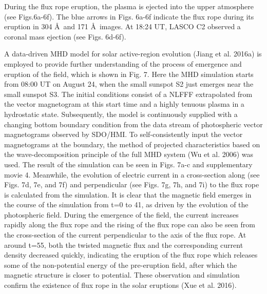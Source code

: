 \documentclass[12pt,preprint]{aastex}
\begin{document}
\begin{CJK*}{UTF8}{gbsn}
During the flux rope eruption, the plasma is ejected into the upper atmosphere (see Figs.6a-6f).  The blue arrows in Figs. 6a-6f indicate the flux rope during its eruption in 304 \AA\ and 171 \AA\ images. At 18:24 UT, LASCO C2 observed a coronal mass ejection (see Figs. 6d-6f).

A data-driven MHD model for solar active-region evolution (Jiang et al. 2016a) is employed to provide further understanding of the process of emergence and eruption of the field, which is shown in Fig. 7. Here the MHD simulation starts from 08:00 UT on August 24, when the small sunspot S2 just emerges near the small sunspot S3. The initial conditions consist of a NLFFF extrapolated from the vector magnetogram at this start time and a highly tenuous plasma in a hydrostatic state. Subsequently, the model is continuously supplied with a changing bottom boundary condition from the data stream of photospheric vector magnetograms observed by SDO/HMI. To self-consistently input the vector magnetograms at the boundary, the method of projected characteristics based on the wave-decomposition principle of the full MHD system (Wu et al. 2006) was used. The result of the simulation can be seen in Figs. 7a-c and supplementary movie 4. Meanwhile, the evolution of electric current in a cross-section along (see Figs. 7d, 7e, and 7f) and perpendicular (see Figs. 7g, 7h, and 7i) to the flux rope is calculated from the simulation. It is clear that the magnetic field emerges in the course of the simulation from t=0 to 41, as driven by the evolution of the photospheric field.  During the emergence of the field, the current increases rapidly along the flux rope and the rising of the flux rope can also be seen from the cross-section of the current perpendicular to the axis of the flux rope. At around t=55, both the twisted magnetic flux and the corresponding current density decreased quickly, indicating the eruption of the flux rope which releases some of the non-potential energy of the pre-eruption field, after which the magnetic structure is closer to potential. These observation and simulation confirm the existence of flux rope in the solar eruptions (Xue et al. 2016).


\end{CJK*}
\end{document}
